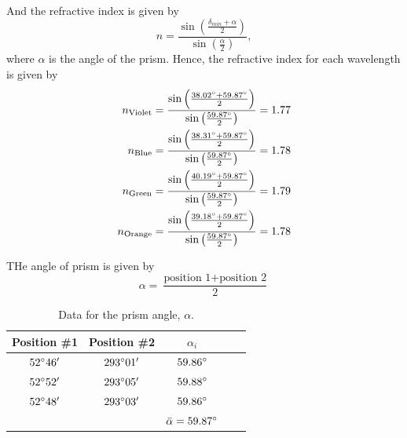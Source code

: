 \documentclass[10pt]{article}
\begin{document}
And the refractive index is given by
\begin{equation}
    n = \frac{\sin\left(\frac{\delta_{min}+\alpha}{2}\right)}{\sin\left(\frac{\alpha}{2}\right)},
\end{equation}
where $\alpha$ is the angle of the prism. Hence, the refractive index for each wavelength is given by
\begin{align}
    n_{\text{Violet}} &= \frac{\sin\left(\frac{38.02\degree+59.87\degree}{2}\right)}{\sin\left(\frac{59.87\degree}{2}\right)} = 1.77 \\
    n_{\text{Blue}} &= \frac{\sin\left(\frac{38.31\degree+59.87\degree}{2}\right)}{\sin\left(\frac{59.87\degree}{2}\right)} = 1.78 \\
    n_{\text{Green}} &= \frac{\sin\left(\frac{40.19\degree+59.87\degree}{2}\right)}{\sin\left(\frac{59.87\degree}{2}\right)} = 1.79 \\
    n_{\text{Orange}} &= \frac{\sin\left(\frac{39.18\degree+59.87\degree}{2}\right)}{\sin\left(\frac{59.87\degree}{2}\right)} = 1.78
\end{align}


THe angle of prism is given by
\begin{equation}
    \alpha = \dfrac{\text{position 1}+\text{position 2}}{2}
\end{equation}

\begin{table}[ht]
    \centering
    \begin{tabular}{|c|c|c|c|c|}
        \hline 
        Position \#1 & Position \#2 & $\alpha_i$ \\
        \hline
        $52\degree 46'$ & $293\degree 01'$ & $59.86\degree$ \\
        \hline
        $52\degree 52'$ & $293\degree 05'$ & $59.88\degree$ \\
        \hline
        $52\degree 48'$ & $293\degree 03'$ & $59.86\degree$ \\
        \hline
        & & $\bar{\alpha} = 59.87\degree$ \\
        \hline
    \end{tabular}
    \caption{Data for the prism angle, $\alpha$.}
    \label{tab:1}
\end{table}
\end{document}
